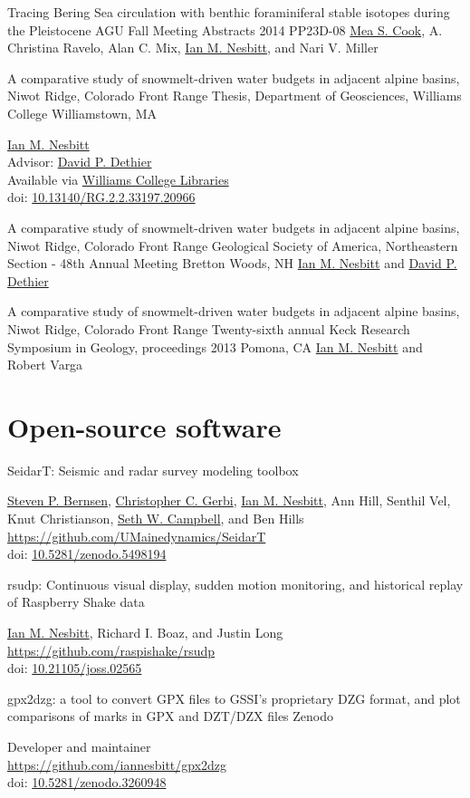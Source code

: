 \documentclass[a4paper,12pt,sans,colorlinks]{moderncv}
\newcommand{\me}{\href{https://www.iannesbitt.org}{Ian M. Nesbitt}}
\newcommand{\seth}{\href{https://www.alpinesciences.net}{Seth W. Campbell}}
\newcommand{\stevebernsen}{\href{https://watc.alaska.edu/node/73}{Steven P. Bernsen}}
\newcommand{\chris}{\href{https://umaine.edu/earthclimate/people/christopher-gerbi/}{Christopher C. Gerbi}}
\newcommand{\richard}{Richard I. Boaz}
\newcommand{\mea}{\href{https://geosciences.williams.edu/profile/msc1/}{Mea S. Cook}}
\newcommand{\david}{\href{https://geosciences.williams.edu/profile/ddethier/}{David P. Dethier}}
\newcommand{\williamsthesis}{\href{https://unbound.williams.edu/theses/islandora/object/studenttheses:766}{Williams College Libraries}}
\newcommand{\doi}[1]{%
    \href{https://doi.org/#1}{#1}
}
\begin{document}
{Tracing Bering Sea circulation with benthic
foraminiferal stable isotopes during the Pleistocene}
{AGU Fall Meeting Abstracts 2014}
{}
{PP23D-08}
{
    \mea{}, A. Christina Ravelo, Alan C. Mix, \me{},
    and Nari V. Miller
}

{A comparative study of snowmelt-driven water budgets in
adjacent alpine basins, Niwot Ridge, Colorado Front Range}
{Thesis, Department of Geosciences, Williams College}
{Williamstown, MA}
{}
{
    \me{}
    \\
    Advisor: \david
    \\
    Available via \williamsthesis
    \\
    doi: \doi{10.13140/RG.2.2.33197.20966}
}

{A comparative study of snowmelt-driven water budgets in
adjacent alpine basins, Niwot Ridge, Colorado Front Range}
{Geological Society of America, Northeastern Section - 48th Annual Meeting}
{Bretton Woods, NH}
{}
{
    \me{} and \david{}
}

{A comparative study of snowmelt-driven water budgets in
adjacent alpine basins, Niwot Ridge, Colorado Front Range}
{Twenty-sixth annual Keck Research Symposium in Geology, proceedings 2013}
{Pomona, CA}
{}
{
    \me{} and Robert Varga
}


\section{Open-source software}

{SeidarT: Seismic and radar survey modeling toolbox}
{}
{}
{}
{
    \stevebernsen{}, \chris{}, \me{}, Ann Hill, Senthil Vel,
    Knut Christianson, \seth{}, and Ben Hills
    \\
    \url{https://github.com/UMainedynamics/SeidarT}
    \\
    doi: \doi{10.5281/zenodo.5498194}
}

{rsudp: Continuous visual display, sudden motion monitoring,
and historical replay of Raspberry Shake data}
{}
{}
{}
{
    \me{}, \richard{}, and Justin Long
    \\
    \url{https://github.com/raspishake/rsudp}
    \\
    doi: \doi{10.21105/joss.02565}
}

{gpx2dzg: a tool to convert GPX files to GSSI's proprietary DZG
format, and plot comparisons of marks in GPX and DZT/DZX files}
{Zenodo}
{}
{}
{
    Developer and maintainer
    \\
    \url{https://github.com/iannesbitt/gpx2dzg}
    \\
    doi: \doi{10.5281/zenodo.3260948}
}
\end{document}
